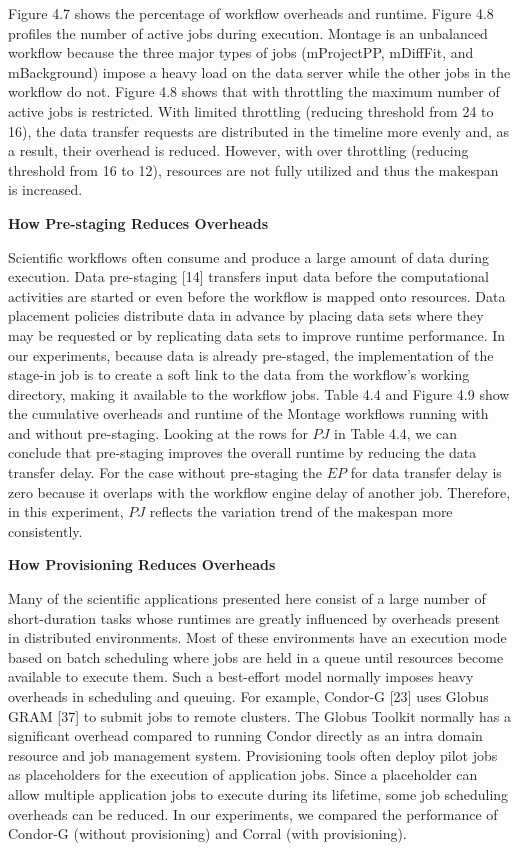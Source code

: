 Figure 4.7 shows the percentage of workflow overheads and runtime. Figure 4.8 profiles the number of active jobs during execution. Montage is an unbalanced workflow because the three major types of jobs (mProjectPP, mDiffFit, and mBackground) impose a heavy load on the data server while the other jobs in the workflow do not. Figure 4.8 shows that with throttling the maximum number of active jobs is restricted. With limited throttling (reducing threshold from 24 to 16), the data transfer requests are distributed in the timeline more evenly and, as a result, their overhead is reduced. However, with over throttling (reducing threshold from 16 to 12), resources are not fully utilized and thus the makespan is increased. 

\textbf{How Pre-staging Reduces Overheads}

Scientific workflows often consume and produce a large amount of data during execution. Data pre-staging [14] transfers input data before the computational activities are started or even before the workflow is mapped onto resources. Data placement policies distribute data in advance by placing data sets where they may be requested or by replicating data sets to improve runtime performance. In our experiments, because data is already pre-staged, the implementation of the stage-in job is to create a soft link to the data from the workflow’s working directory, making it available to the workflow jobs. Table 4.4 and Figure 4.9 show the cumulative overheads and runtime of the Montage workflows running with and without pre-staging. Looking at the rows for $PJ$ in Table 4.4, we can conclude that pre-staging improves the overall runtime by reducing the data transfer delay. For the case without pre-staging the $EP$ for data transfer delay is zero because it overlaps with the workflow engine delay of another job. Therefore, in this experiment, $PJ$ reflects the variation trend of the makespan more consistently. 

\textbf{How Provisioning Reduces Overheads}

Many of the scientific applications presented here consist of a large number of short-duration tasks whose runtimes are greatly influenced by overheads present in distributed environments. Most of these environments have an execution mode based on batch scheduling where jobs are held in a queue until resources become available to execute them. Such a best-effort model normally imposes heavy overheads in scheduling and queuing. For example, Condor-G [23] uses Globus GRAM [37] to submit jobs to remote clusters. The Globus Toolkit normally has a significant overhead compared to running Condor directly as an intra domain resource and job management system. Provisioning tools often deploy pilot jobs as placeholders for the execution of application jobs. Since a placeholder can allow multiple application jobs to execute during its lifetime, some job scheduling overheads can be reduced. In our experiments, we compared the performance of Condor-G (without provisioning) and Corral (with provisioning). 

